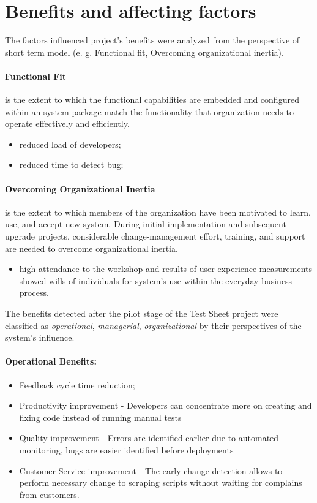 \section{Benefits and affecting factors}
The factors influenced project's benefits were analyzed from the perspective of short term model (e. g. Functional fit, Overcoming organizational inertia).
\paragraph{Functional Fit} is the extent to which the functional capabilities are embedded and configured within an system package match the functionality that organization needs to operate effectively and efficiently.
\begin{itemize}
	\item reduced load of developers;
	\item reduced time to detect bug;
\end{itemize}

\paragraph{Overcoming Organizational Inertia} is the extent to which members of the organization have been motivated to learn, use, and accept new system. During initial implementation and subsequent upgrade projects, considerable change-management effort, training, and support are needed to overcome organizational inertia.
\begin{itemize}
	\item high attendance to the workshop and  results of user experience measurements showed wills of individuals for system's use within the everyday business process.
\end{itemize}

The benefits detected after the pilot stage of the Test Sheet project were classified  as \textit{operational}, \textit{managerial}, \textit{organizational} by their perspectives of the system's influence.

\paragraph{Operational Benefits:}
\begin{itemize}
	\item Feedback cycle time reduction;
	\item Productivity improvement - Developers can concentrate more on creating and fixing code instead of running manual tests
	\item Quality improvement - Errors are identified earlier due to automated monitoring, bugs are easier identified before deployments
	\item Customer Service improvement - The early change detection allows to perform necessary change to scraping scripts without waiting for complains from customers.
\end{itemize}

